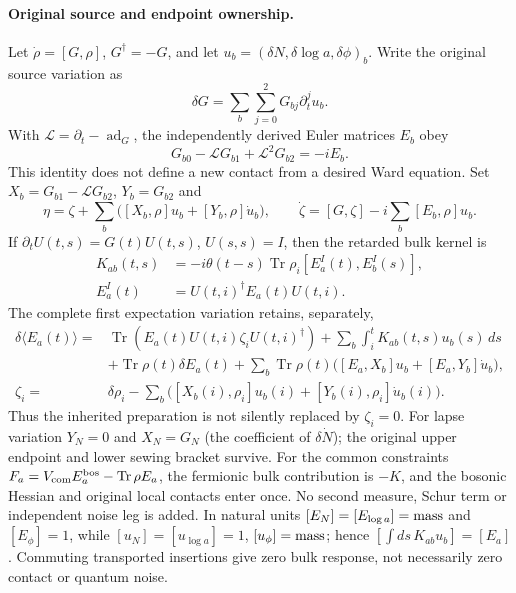 \documentclass[11pt]{article}
\begin{document}
\paragraph{Original source and endpoint ownership.}
Let $\dot\rho=[G,\rho]$, $G^\dagger=-G$, and let
$u_b=(\delta N,\delta\log a,\delta\phi)_b$.
Write the original source variation as
\[
\delta G=\sum_b\sum_{j=0}^2G_{bj}\partial_t^j u_b.
\]
With $\mathcal L=\partial_t-\operatorname{ad}_G$, the independently derived
Euler matrices $E_b$ obey
\[
G_{b0}-\mathcal L G_{b1}+\mathcal L^2G_{b2}=-iE_b.
\]
This identity does not define a new contact from a desired Ward equation.
Set $X_b=G_{b1}-\mathcal L G_{b2}$, $Y_b=G_{b2}$ and
\[
\eta=\zeta+\sum_b\bigl([X_b,\rho]u_b+[Y_b,\rho]\dot u_b\bigr),
\qquad
\dot\zeta=[G,\zeta]-i\sum_b[E_b,\rho]u_b .
\]
If $\partial_t U(t,s)=G(t)U(t,s)$, $U(s,s)=I$, then the retarded bulk kernel is
\begin{align}
K_{ab}(t,s)&=-i\theta(t-s)
 \operatorname{Tr}\rho_i[E_a^I(t),E_b^I(s)],\\
E_a^I(t)&=U(t,i)^\dagger E_a(t)U(t,i).
\end{align}
The complete first expectation variation retains, separately,
\begin{align}
\delta\langle E_a(t)\rangle
={}&\operatorname{Tr}\!\left(E_a(t)U(t,i)\zeta_iU(t,i)^\dagger\right)
+\sum_b\int_i^t K_{ab}(t,s)u_b(s)\,ds \nonumber\\
&+\operatorname{Tr}\rho(t)\delta E_a(t)
+\sum_b\operatorname{Tr}\rho(t)
 \bigl([E_a,X_b]u_b+[E_a,Y_b]\dot u_b\bigr),\\
\zeta_i={}&\delta\rho_i-\sum_b
 \bigl([X_b(i),\rho_i]u_b(i)+[Y_b(i),\rho_i]\dot u_b(i)\bigr).
\end{align}
Thus the inherited preparation is not silently replaced by $\zeta_i=0$.
For lapse variation $Y_N=0$ and $X_N=G_{N\dot{}}$ (the coefficient of
$\delta\dot N$); the original upper endpoint and lower sewing bracket survive.
For the common constraints
$F_a=V_{\rm com}E_a^{\rm bos}-\operatorname{Tr}\rho E_a$,
the fermionic bulk contribution is $-K$, and the bosonic Hessian and original
local contacts enter once. No second measure, Schur term or independent
noise leg is added.
In natural units $[E_N]=[E_{\log a}]={\rm mass}$ and $[E_\phi]=1$,
while $[u_N]=[u_{\log a}]=1$, $[u_\phi]={\rm mass}$; hence
$[\int ds\,K_{ab}u_b]=[E_a]$.
Commuting transported insertions give zero bulk response, not necessarily
zero contact or quantum noise.
\end{document}
